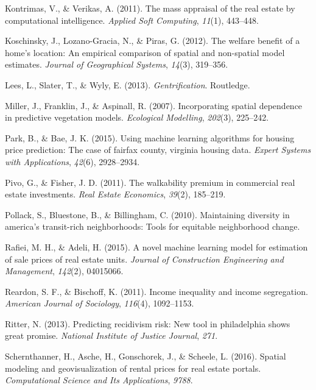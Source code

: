 \documentclass[conference,final,]{IEEEtran}
\begin{document}
\leavevmode\hypertarget{ref-Kontrimasa2011}{}%
Kontrimas, V., \& Verikas, A. (2011). The mass appraisal of the real
estate by computational intelligence. \emph{Applied Soft Computing},
\emph{11}(1), 443--448.

\leavevmode\hypertarget{ref-Koschinsky2012}{}%
Koschinsky, J., Lozano-Gracia, N., \& Piras, G. (2012). The welfare
benefit of a home's location: An empirical comparison of spatial and
non-spatial model estimates. \emph{Journal of Geographical Systems},
\emph{14}(3), 319--356.

\leavevmode\hypertarget{ref-Lees2008}{}%
Lees, L., Slater, T., \& Wyly, E. (2013). \emph{Gentrification}.
Routledge.

\leavevmode\hypertarget{ref-Miller2015}{}%
Miller, J., Franklin, J., \& Aspinall, R. (2007). Incorporating spatial
dependence in predictive vegetation models. \emph{Ecological Modelling},
\emph{202}(3), 225--242.

\leavevmode\hypertarget{ref-Park2015}{}%
Park, B., \& Bae, J. K. (2015). Using machine learning algorithms for
housing price prediction: The case of fairfax county, virginia housing
data. \emph{Expert Systems with Applications}, \emph{42}(6), 2928--2934.

\leavevmode\hypertarget{ref-Pivo2011}{}%
Pivo, G., \& Fisher, J. D. (2011). The walkability premium in commercial
real estate investments. \emph{Real Estate Economics}, \emph{39}(2),
185--219.

\leavevmode\hypertarget{ref-Pollack2010}{}%
Pollack, S., Bluestone, B., \& Billingham, C. (2010). Maintaining
diversity in america's transit-rich neighborhoods: Tools for equitable
neighborhood change.

\leavevmode\hypertarget{ref-Rafiei2016}{}%
Rafiei, M. H., \& Adeli, H. (2015). A novel machine learning model for
estimation of sale prices of real estate units. \emph{Journal of
Construction Engineering and Management}, \emph{142}(2), 04015066.

\leavevmode\hypertarget{ref-Reardon2011}{}%
Reardon, S. F., \& Bischoff, K. (2011). Income inequality and income
segregation. \emph{American Journal of Sociology}, \emph{116}(4),
1092--1153.

\leavevmode\hypertarget{ref-Ritter2013}{}%
Ritter, N. (2013). Predicting recidivism risk: New tool in philadelphia
shows great promise. \emph{National Institute of Justice Journal},
\emph{271}.

\leavevmode\hypertarget{ref-Schernthanner2016}{}%
Schernthanner, H., Asche, H., Gonschorek, J., \& Scheele, L. (2016).
Spatial modeling and geovisualization of rental prices for real estate
portals. \emph{Computational Science and Its Applications}, \emph{9788}.
\end{document}
